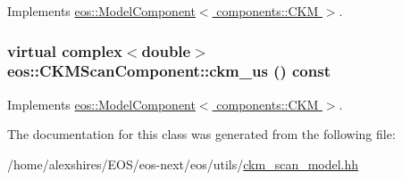 Implements \hyperlink{classeos_1_1ModelComponent_3_01components_1_1CKM_01_4_a56044f519ef2befa09d4912cb8f9188a}{eos::ModelComponent$<$ components::CKM $>$}.\hypertarget{classeos_1_1CKMScanComponent_a1ac8c31a252962bd381b604a60fe914d}{
\subsubsection[{ckm\_\-us}]{\setlength{\rightskip}{0pt plus 5cm}virtual complex$<$double$>$ eos::CKMScanComponent::ckm\_\-us () const}}
\label{classeos_1_1CKMScanComponent_a1ac8c31a252962bd381b604a60fe914d}


Implements \hyperlink{classeos_1_1ModelComponent_3_01components_1_1CKM_01_4_ac3363cbfe22a4354e833a67fdc5ed1fa}{eos::ModelComponent$<$ components::CKM $>$}.

The documentation for this class was generated from the following file:\begin{DoxyCompactItemize}
\item 
/home/alexshires/EOS/eos-\/next/eos/utils/\hyperlink{ckm__scan__model_8hh}{ckm\_\-scan\_\-model.hh}\end{DoxyCompactItemize}
